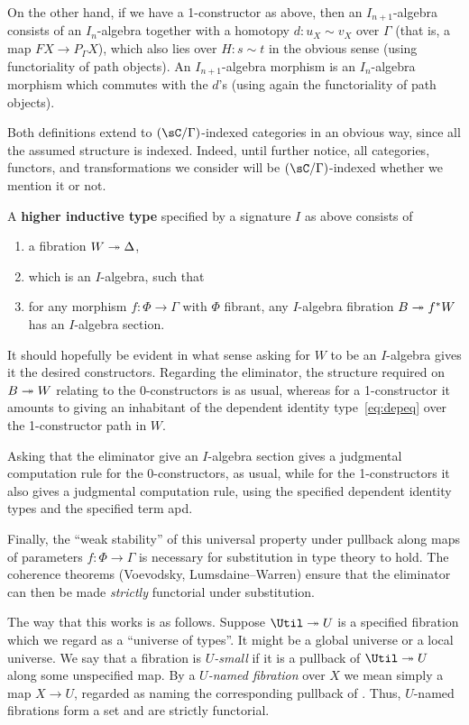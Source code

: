 \documentclass{amsart}
\begin{document}
On the other hand, if we have a 1-constructor as above, then an $I_{n+1}$-algebra consists of an $I_n$-algebra together with a homotopy $d:u_X \sim v_X$ over $\Gamma$ (that is, a map $FX \to P_\Gamma X$), which also lies over $H:s\sim t$ in the obvious sense (using functoriality of path objects).
An $I_{n+1}$-algebra morphism is an $I_n$-algebra morphism which commutes with the $d$'s (using again the functoriality of path objects).

Both definitions extend to $(\sC/\Gamma)$-indexed categories in an obvious way, since all the assumed structure is indexed.
Indeed, until further notice, all categories, functors, and transformations we consider will be $(\sC/\Gamma)$-indexed whether we mention it or not.

\begin{defn}\label{def:hit}
  A \textbf{higher inductive type} specified by a signature $I$ as above consists of
  \begin{enumerate}
  \item a fibration $W\twoheadrightarrow \Delta$,
  \item which is an $I$-algebra, such that
  \item for any morphism $f:\Phi\to\Gamma$ with $\Phi$ fibrant, any $I$-algebra fibration $B\twoheadrightarrow f^* W$ has an $I$-algebra section.\label{item:hit3}
  \end{enumerate}
\end{defn}

It should hopefully be evident in what sense asking for $W$ to be an $I$-algebra gives it the desired constructors.
Regarding the eliminator, the structure required on $B\twoheadrightarrow W$ relating to the 0-constructors is as usual, whereas for a 1-constructor it amounts to giving an inhabitant of the dependent identity type~\eqref{eq:depeq} over the 1-constructor path in $W$.

Asking that the eliminator give an $I$-algebra section gives a judgmental computation rule for the 0-constructors, as usual, while for the 1-constructors it also gives a judgmental computation rule, using the specified dependent identity types and the specified term \textsf{apd}.

Finally, the ``weak stability'' of this universal property under pullback along maps of parameters $f:\Phi\to\Gamma$ is necessary for substitution in type theory to hold.
The coherence theorems (Voevodsky, Lumsdaine--Warren) ensure that the eliminator can then be made \emph{strictly} functorial under substitution.

The way that this works is as follows.
Suppose $\Util\fib U$ is a specified fibration which we regard as a ``universe of types''.
It might be a global universe or a local universe.
We say that a fibration is \emph{$U$-small} if it is a pullback of $\Util\fib U$ along some unspecified map.
By a \emph{$U$-named fibration} over $X$ we mean simply a map $X\to U$, regarded as naming the corresponding pullback of \Util.
Thus, $U$-named fibrations form a set and are strictly functorial.
\end{document}
